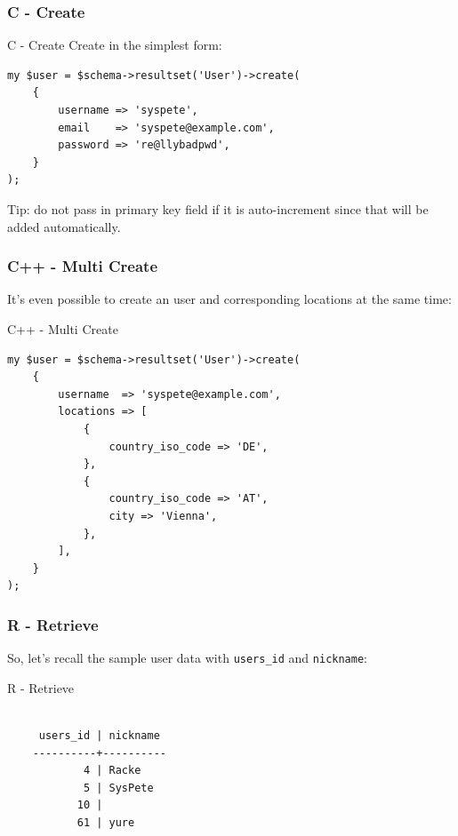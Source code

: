 \subsubsection{C - Create}
\begin{frame}[fragile]{C - Create}
Create in the simplest form:

\begin{lstlisting}
my $user = $schema->resultset('User')->create(
    {
        username => 'syspete',
        email    => 'syspete@example.com',
        password => 're@llybadpwd',
    }
);
\end{lstlisting}
\end{frame}

Tip: do not pass in primary key field if it is auto-increment since that will be added automatically.

\subsubsection{C++ - Multi Create}
It's even possible to create an user and corresponding locations at the
same time:

\begin{frame}[fragile]{C++ - Multi Create}
\begin{lstlisting}
my $user = $schema->resultset('User')->create(
    {
        username  => 'syspete@example.com',
        locations => [
            {
                country_iso_code => 'DE',
            },
            {
                country_iso_code => 'AT',
                city => 'Vienna',
            },
        ],
    }
);
\end{lstlisting}
\end{frame}

\subsubsection{R - Retrieve}

So, let's recall the sample user data with
\verb|users_id| and \verb|nickname|:

\begin{frame}[fragile]{R - Retrieve}
\begin{lstlisting}

     users_id | nickname
    ----------+----------
            4 | Racke
            5 | SysPete
           10 |
           61 | yure

\end{lstlisting}
\end{frame}

